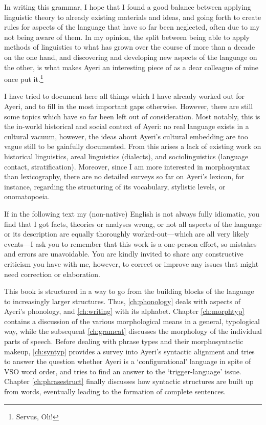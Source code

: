 In writing this grammar, I hope that I found a good balance between applying
linguistic theory to already existing materials and ideas, and going forth to
create rules for aspects of the language that have so far been neglected, often
due to my not being aware of them. In my opinion, the split between being able
to apply methods of linguistics to what has grown over the course of more than
a decade on the one hand, and discovering and developing new aspects of the
language on the other, is what makes Ayeri an interesting piece of
 as a dear colleague of mine once put
it.\footnote{Servus, Oli!}

I have tried to document here all things which I have already worked out for
Ayeri, and to fill in the most important gaps otherwise. However, there are
still some topics which have so far been left out of consideration. Most
notably, this is the in-world historical and social context of Ayeri: no real
language exists in a cultural vacuum, however, the ideas about Ayeri's cultural
embedding are too vague still to be gainfully documented. From this arises a
lack of existing work on historical linguistics, areal linguistics (dialects),
and sociolinguistics (language contact, stratification). Moreover, since I am
more interested in morphosyntax than lexicography, there are no detailed
surveys so far on Ayeri's lexicon, for instance, regarding the structuring of
its vocabulary, stylistic levels, or onomatopoeia.

If in the following text my (non-native) English is not always fully idiomatic,
you find that I got facts, theories or analyses wrong, or not all aspects of
the language or its description are equally thoroughly worked-out---which are
all very likely events---I ask you to remember that this work is a one-person
effort, so mistakes and errors are unavoidable. You are kindly invited to share
any constructive criticism you have with me, however, to correct or improve any
issues that might need correction or elaboration.

This book is structured in a way to go from the building blocks of the language
to increasingly larger structures. Thus, \autoref{ch:phonology} deals with
aspects of Ayeri's phonology, and \autoref{ch:writing} with its alphabet.
Chapter \ref{ch:morphtyp} contains a discussion of the various morphological
means in a general, typological way, while the subsequent \autoref{ch:gramcat}
discusses the morphology of the individual parts of speech. Before dealing with
phrase types and their morphosyntactic makeup, \autoref{ch:syntyp} provides a
survey into Ayeri's syntactic alignment and tries to answer the question
whether Ayeri is a `configurational' language in spite of VSO word order, and
tries to find an answer to the `trigger-language' issue. Chapter
\ref{ch:phrasestruct} finally discusses how syntactic structures are built up
from words, eventually leading to the formation of complete sentences.
